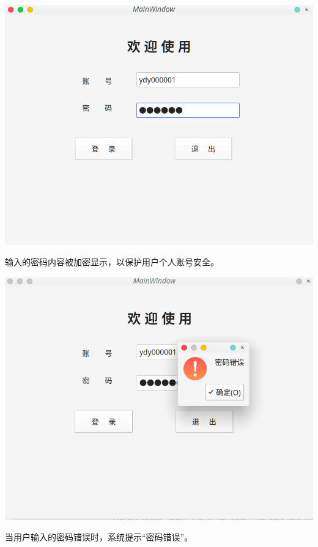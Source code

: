 \documentclass[a4paper,UTF8]{article}
\begin{document}
{\centering\includegraphics[width=1\columnwidth]{2.png}
	
}

输入的密码内容被加密显示，以保护用户个人账号安全。

{\centering\includegraphics[width=1\columnwidth]{3.png}
	
}

当用户输入的密码错误时，系统提示“密码错误”。
\end{document}
